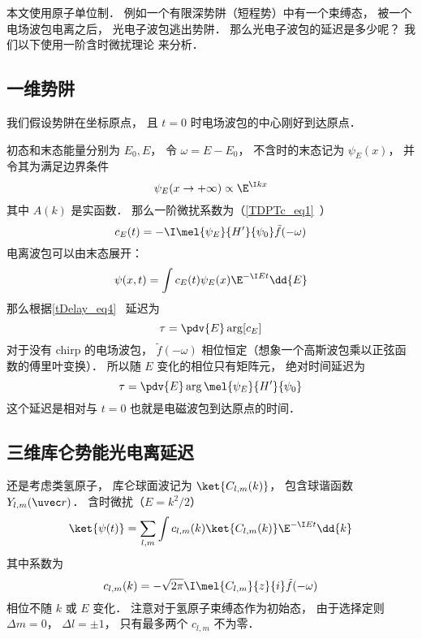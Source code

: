 
\begin{issues}
\issueDraft
\end{issues}


本文使用原子单位制． 例如一个有限深势阱（短程势）中有一个束缚态， 被一个电场波包电离之后， 光电子波包逃出势阱． 那么光电子波包的延迟是多少呢？ 我们以下使用一阶含时微扰理论 来分析．

\subsection{一维势阱}
我们假设势阱在坐标原点， 且 $t = 0$ 时电场波包的中心刚好到达原点．

初态和末态能量分别为 $E_0, E$， 令 $\omega = E - E_0$， 不含时的末态记为 $\psi_E(x)$， 并令其为满足边界条件
\begin{equation}\label{HeAna2_eq2}
\psi_E(x \to +\infty) \propto \E^{\I kx}
\end{equation}
其中 $A(k)$ 是实函数． 那么一阶微扰系数为（\autoref{TDPTc_eq1}~）
\begin{equation}
c_E(t) = -\I  \mel{\psi_E}{H'}{\psi_0} \tilde f(-\omega)
\end{equation}
电离波包可以由末态展开：
\begin{equation}
\psi(x, t) = \int c_E(t) \psi_E(x)\E^{-\I E t} \dd{E}
\end{equation}
那么根据\autoref{tDelay_eq4}~ 延迟为
\begin{equation}\label{HeAna2_eq3}
\tau = \pdv{E} \arg [c_E]
\end{equation}
对于没有 chirp 的电场波包， $\tilde f(-\omega)$ 相位恒定（想象一个高斯波包乘以正弦函数的傅里叶变换）． 所以随 $E$ 变化的相位只有矩阵元， 绝对时间延迟为
\begin{equation}\label{HeAna2_eq1}
\tau = \pdv{E} \arg \mel{\psi_E}{H'}{\psi_0}
\end{equation}
这个延迟是相对与 $t = 0$ 也就是电磁波包到达原点的时间．

\subsection{三维库仑势能光电离延迟}\label{HeAna2_sub1}
还是考虑类氢原子， 库仑球面波记为 $\ket{C_{l,m}(k)}$， 包含球谐函数 $Y_{l,m}(\uvec r)$． 含时微扰（$E = k^2/2$）
\begin{equation}\label{HeAna2_eq4}
\ket{\psi(t)} = \sum_{l,m} \int c_{l,m}(k) \ket{C_{l,m}(k)} \E^{-\I E t} \dd{k}
\end{equation}
其中系数为
\begin{equation}
c_{l,m}(k) = -\sqrt{2\pi}\I \mel{C_{l,m}}{z}{i} \tilde f(-\omega)
\end{equation}
相位不随 $k$ 或 $E$ 变化． 注意对于氢原子束缚态作为初始态， 由于选择定则 $\Delta m = 0$， $\Delta l = \pm 1$， 只有最多两个 $c_{l,m}$ 不为零．

